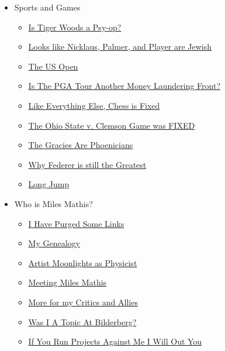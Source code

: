 \documentclass{article}
\newcommand{\insertmydocument}[2]{ %
  \item \href{http://www.mileswmathis.com/#2}{#1}
}
\begin{document}
\begin{itemize}
\begin{itemize}
\begin{itemize}
    \end{itemize}

    \item Sports and Games
    \begin{itemize}

      \insertmydocument{Is Tiger Woods a Psy-op?}{tiger.pdf}
      \insertmydocument{Looks like Nicklaus, Palmer, and Player are Jewish}{nick.pdf}
      \insertmydocument{The US Open}{decham.pdf}
      \insertmydocument{Is The PGA Tour Another Money Laundering Front?}{pga.pdf}
      \insertmydocument{Like Everything Else, Chess is Fixed}{fischer.pdf}
      \insertmydocument{The Ohio State v. Clemson Game was FIXED}{law.pdf}
      \insertmydocument{The Gracies Are Phoenicians}{gracies.pdf}
      \insertmydocument{Why Federer is still the Greatest}{feder.pdf}
      \insertmydocument{Long Jump}{longjump.pdf}
    \end{itemize}

    \item Who is Miles Mathis?
    \begin{itemize}

      \insertmydocument{I Have Purged Some Links}{self.pdf}
      \insertmydocument{My Genealogy}{self2.pdf}
      \insertmydocument{Artist Moonlights as Physicist}{moonlights.pdf}
      \insertmydocument{Meeting Miles Mathis}{maria.pdf}
      \insertmydocument{More for my Critics and Allies}{jackboot.pdf}
      \insertmydocument{Was I A Topic At Bilderberg?}{jack2.pdf}
      \insertmydocument{If You Run Projects Against Me I Will Out You}{hutt.pdf}

    \end{itemize}

  \end{itemize}
\end{itemize}
\end{document}
